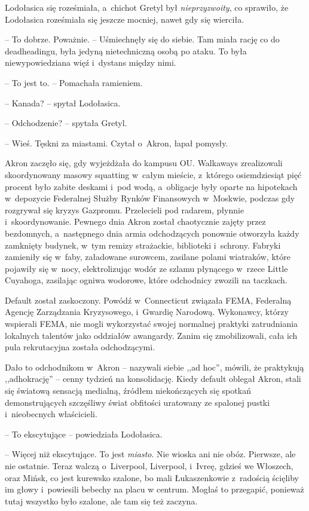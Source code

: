 \documentclass[oneside,polish,11pt,sfheadings]{mwbk}
\begin{document}
Lodołasica się roześmiała, a~chichot Gretyl był \textit{nieprzyzwoity}, co
sprawiło, że Lodołasica roześmiała się jeszcze mocniej, nawet gdy się
wierciła. 

-- To dobrze. Poważnie. -- Uśmiechnęły się do siebie. Tam miała
rację co do deadheadingu, była jedyną nietechniczną osobą po ataku. To
była niewypowiedziana więź i~dystans między nimi.

-- To jest to. -- Pomachała ramieniem.

-- Kanada? -- spytał Lodołasica.

-- Odchodzenie? -- spytała Gretyl.

-- Wieś. Tęskni za miastami. Czytał o~Akron, łapał pomysły.

Akron zaczęło się, gdy wyjeżdżała do kampusu OU. Walkaways zrealizowali
skoordynowany masowy squatting w~całym mieście, z~którego osiemdziesiąt
pięć procent było zabite deskami i~pod wodą, a~obligacje były oparte na
hipotekach w~depozycie Federalnej Służby Rynków Finansowych w~Moskwie,
podczas gdy rozgrywał się kryzys Gazpromu. Przelecieli pod radarem,
płynnie i~skoordynowanie. Pewnego dnia Akron został chaotycznie zajęty
przez bezdomnych, a~następnego dnia armia odchodzących ponownie
otworzyła każdy zamknięty budynek, w~tym remizy strażackie, biblioteki i~schrony. Fabryki zamieniły się w~faby, załadowane surowcem, zasilane
polami wiatraków, które pojawiły się w~nocy, elektrolizując wodór ze
szlamu płynącego w~rzece Little Cuyahoga, zasilając ogniwa wodorowe,
które odchodnicy zwozili na taczkach.

Default został zaskoczony. Powódź w~Connecticut związała FEMA, Federalną
Agencję Zarządzania Kryzysowego, i~Gwardię Narodową. Wykonawcy, którzy
wspierali FEMA, nie mogli wykorzystać swojej normalnej praktyki
zatrudniania lokalnych talentów jako oddziałów awangardy. Zanim się
zmobilizowali, cała ich pula rekrutacyjna została odchodzącymi.

Dało to odchodnikom w~Akron -- nazywali siebie ,,ad hoc'', mówili, że
praktykują ,,adhokrację'' -- cenny tydzień na konsolidację. Kiedy default
oblegał Akron, stali się światową sensacją medialną, źródłem
niekończących się spotkań demonstrujących szczęśliwy świat obfitości
uratowany ze spalonej pustki i~nieobecnych właścicieli.

-- To ekscytujące -- powiedziała Lodołasica.

-- Więcej niż ekscytujące. To jest \textit{miasto}. Nie wioska ani nie
obóz. Pierwsze, ale nie ostatnie. Teraz walczą o~Liverpool, Liverpool, i~Ivreę, gdzieś we Włoszech, oraz Mińsk, co jest kurewsko szalone, bo mali
Łukaszenkowie z~radością ścięliby im głowy i~powiesili bebechy na placu
w centrum. Mogłaś to przegapić, ponieważ tutaj wszystko było szalone,
ale tam się też zaczyna.
\end{document}

